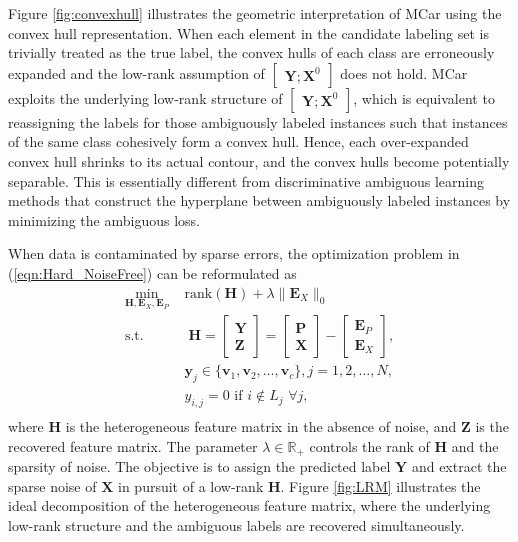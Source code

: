 \documentclass[10pt,journal,compsoc]{IEEEtran}
\begin{document}
Figure \ref{fig:convexhull} illustrates the geometric interpretation of MCar using the convex hull representation. When each element in the candidate labeling set is trivially treated as the true label, the convex hulls of each class are erroneously expanded and the low-rank assumption of $\begin{bmatrix}
\mathbf{Y} ;
\mathbf{X}^0
\end{bmatrix}$ does not hold.
MCar exploits the underlying low-rank structure of $\begin{bmatrix}
\mathbf{Y} ;
\mathbf{X}^0
\end{bmatrix}$, which is equivalent to reassigning the labels for those ambiguously labeled instances such that instances of the same class cohesively form a convex hull. Hence, each over-expanded convex hull shrinks to its actual contour, and the convex hulls become potentially separable. This is essentially different from discriminative ambiguous learning methods that construct the hyperplane between ambiguously labeled instances by minimizing the ambiguous loss.

When data is contaminated by sparse errors, the optimization problem in (\ref{eqn:Hard_NoiseFree}) can be reformulated as
\begin{equation}
\begin{aligned}
 \min_{\mathbf{H}, \mathbf{E}_X, \mathbf{E}_P} \,\, & \mathrm{rank} (\mathbf{H}) + \lambda \|\mathbf{E}_X\|_0  \\
 \text{s.t.} & \;
{\mathbf{H}}= \begin{bmatrix}
\mathbf{Y} \\
\mathbf{Z}
\end{bmatrix}= \begin{bmatrix}
\mathbf{P} \\
\mathbf{X}
\end{bmatrix} - \begin{bmatrix}
\mathbf{E}_P \\
\mathbf{E}_X
\end{bmatrix},\\
& \mathbf{y}_j \in \{\mathbf{v}_1, \mathbf{v}_2, \dots, \mathbf{v}_c\}, j = 1, 2, \dots, N,\\
& y_{i,j} = 0 \,\, \mathrm{if}  \,\, i \notin L_j \,\, \forall j, \\
\end{aligned}\label{eqn:Hard}
\end{equation}
where $\mathbf{H}$ is the heterogeneous feature matrix in the absence of noise, and $\mathbf{Z}$ is the recovered feature matrix. The parameter $\lambda \in \mathbb{R}_+$ controls the rank of $\mathbf{H}$ and the sparsity of noise. The objective is to assign the predicted label $\mathbf{Y}$ and extract the sparse noise of $\mathbf{X}$ in pursuit of a low-rank $\mathbf{H}$. Figure \ref{fig:LRM} illustrates the ideal decomposition of the heterogeneous feature matrix, where the underlying low-rank structure and the ambiguous labels are recovered simultaneously.
\end{document}
